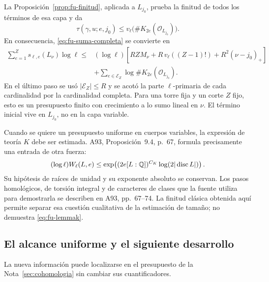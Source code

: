 La Proposición~\ref{prop:fu-finitud}, aplicada a $L_{j_0}$,
prueba la finitud de todos los términos de esa capa y da
\[
 \tau(\gamma,u;e,j_0)
 \le v_\ell\bigl(\#K_{2e}(\mathcal O_{L_{j_0}})\bigr).
\]
En consecuencia, \eqref{eq:fu-suma-completa} se convierte en
\begin{equation}
 \begin{split}
 \sum_{e=1}^{Z}s_{\ell,e}(L_\nu)\log\ell
 \le{}&(\log\ell)
    \left[RZM_\nu+R\,v_\ell((Z-1)!)
                  +R^2(\nu-j_0)_+\right]\\
 &+\sum_{e\in\mathcal E_Z}
       \log\#K_{2e}(\mathcal O_{L_{j_0}}).
 \end{split}
 \label{eq:fu-presupuesto-torre}
\end{equation}
En el último paso se usó $|\mathcal E_Z|\le R$ y se acotó
la parte $\ell$-primaria de cada cardinalidad por la cardinalidad
completa. Para una torre fija y un corte $Z$ fijo, esto es un
presupuesto finito con crecimiento a lo sumo lineal en $\nu$.
El término inicial vive en $L_{j_0}$, no en la capa variable.

Cuando se quiere un presupuesto uniforme en cuerpos variables,
la expresión de teoría $K$ debe ser estimada. A93,
Proposición~9.4, p.~67, formula precisamente una entrada de
otra fuerza:
\begin{equation}
 (\log\ell)W_\ell(L,e)
 \le\exp\!\left((2e[L:\mathbb{Q}])^{C_K}
                       \log(2|\operatorname{disc}L|)\right).
 \label{eq:fu-lemmak}
\end{equation}
Su hipótesis de raíces de unidad y su exponente absoluto se
conservan. Los pasos homológicos, de torsión integral y de
caracteres de clases que la fuente utiliza para demostrarla
se describen en A93, pp.~67--74. La finitud clásica obtenida
aquí permite separar esa cuestión cualitativa de la estimación
de tamaño; no demuestra \eqref{eq:fu-lemmak}.

\subsection{El alcance uniforme y el siguiente desarrollo}

La nueva información puede localizarse en el presupuesto de la
Nota~\ref{sec:cohomologia} sin cambiar sus cuantificadores.

